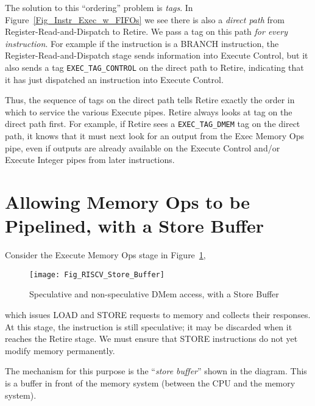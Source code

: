 The solution to this ``ordering'' problem is \emph{tags}.  In
Figure~\ref{Fig_Instr_Exec_w_FIFOs} we see there is also a
\emph{direct path} from Register-Read-and-Dispatch to Retire.  We pass
a tag on this path \emph{for every instruction}.  For example if the
instruction is a BRANCH instruction, the Register-Read-and-Dispatch
stage sends information into Execute Control, but it also sends a tag
\verb|EXEC_TAG_CONTROL| on the direct path to Retire, indicating that
it has just dispatched an instruction into Execute Control.

Thus, the sequence of tags on the direct path tells Retire exactly the
order in which to service the various Execute pipes.  Retire always
looks at tag on the direct path first.  For example, if Retire sees a
\verb|EXEC_TAG_DMEM| tag on the direct path, it knows that it must
next look for an output from the Exec Memory Ops pipe, even if outputs
are already available on the Execute Control and/or Execute Integer
pipes from later instructions.


\section{Allowing Memory Ops to be Pipelined, with a Store Buffer}

\label{Sec_Store_Buffers}


Consider the Execute Memory Ops stage in
Figure~\ref{Fig_RISCV_Store_Buffer},
\begin{figure}[htbp]
  \centerline{\texttt{[image: Fig\_RISCV\_Store\_Buffer]}}
  \caption{\label{Fig_RISCV_Store_Buffer}
           Speculative and non-speculative DMem access, with a Store Buffer}
\end{figure}
which issues LOAD and STORE requests to memory and collects their
responses.  At this stage, the instruction is still speculative; it
may be discarded when it reaches the Retire stage.  We must ensure
that STORE instructions do not yet modify memory permanently.

The mechanism for this purpose is the ``\emph{store buffer}'' shown in
the diagram.  This is a buffer in front of the memory system (between
the CPU and the memory system).

